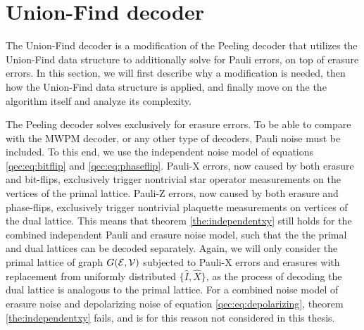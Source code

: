 \section{Union-Find decoder}
The Union-Find decoder \cite{delfosse2017almost} is a modification of the Peeling decoder that utilizes the Union-Find data structure \cite{tarjan1975efficiency} to additionally solve for Pauli errors, on top of erasure errors. In this section, we will first describe why a modification is needed, then how the Union-Find data structure is applied, and finally move on the the algorithm itself and analyze its complexity.

The Peeling decoder solves exclusively for erasure errors. To be able to compare with the MWPM decoder, or any other type of decoders, Pauli noise must be included. To this end, we use the independent noise model of equations \eqref{qec:eq:bitflip} and \eqref{qec:eq:phaseflip}. Pauli-X errors, now caused by both erasure and bit-flips, exclusively trigger nontrivial star operator measurements on the vertices of the primal lattice. Pauli-Z errors, now caused by both erasure and phase-flips, exclusively trigger nontrivial plaquette measurements on vertices of the dual lattice. This means that theorem \ref{the:independentxy} still holds for the combined independent Pauli and erasure noise model, such that the the primal and dual lattices can be decoded separately. Again, we will only consider the primal lattice of graph $G(\mathcal{E},\mathcal{V})$ subjected to Pauli-X errors and erasures with replacement from uniformly distributed $\{\hat{I}, \hat{X}\}$, as the process of decoding the dual lattice is analogous to the primal lattice. For a combined noise model of erasure noise and depolarizing noise of equation \eqref{qec:eq:depolarizing}, theorem \ref{the:independentxy} fails, and is for this reason not considered in this thesis.

